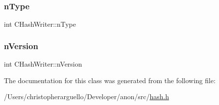 \subsubsection{\texorpdfstring{n\+Type}{nType}}
{\footnotesize\ttfamily int C\+Hash\+Writer\+::n\+Type}

\mbox{\label{class_c_hash_writer_ad7d3642addab58385476dc0f9d55fa58}} 
\subsubsection{\texorpdfstring{n\+Version}{nVersion}}
{\footnotesize\ttfamily int C\+Hash\+Writer\+::n\+Version}



The documentation for this class was generated from the following file\+:\begin{DoxyCompactItemize}
\item 
/\+Users/christopherarguello/\+Developer/anon/src/\mbox{\hyperlink{hash_8h}{hash.\+h}}\end{DoxyCompactItemize}
